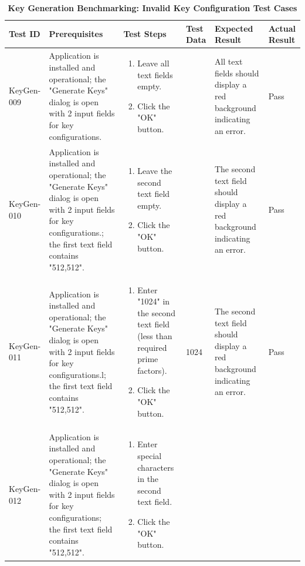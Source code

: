 \documentclass[]{final_report}
\theoremstyle{definition}
\begin{document}
\begin{longtable}{|p{1.5cm}|p{2.5cm}|p{3.5cm}|p{2.5cm}|p{3cm}|p{2cm}|}
  \caption{\textbf{Key Generation Benchmarking: Invalid Key Configuration Test Cases}} \\
  \hline
  \textbf{Test ID} & \textbf{Prerequisites} & \textbf{Test Steps} & \textbf{Test Data} & \textbf{Expected Result} & \textbf{Actual Result} \\
  \hline
  KeyGen-009 & Application is installed and operational; the "Generate Keys" dialog is open with 2 input fields for key configurations. & 
  \begin{enumerate}
  \item Leave all text fields empty.
  \item Click the "OK" button.
  \end{enumerate} & & All text fields should display a red background indicating an error. & Pass \\
  \hline
  KeyGen-010 & Application is installed and operational; the "Generate Keys" dialog is open with 2 input fields for key configurations.; the first text field contains "512,512". & 
  \begin{enumerate}
  \item Leave the second text field empty.
  \item Click the "OK" button.
  \end{enumerate} & & The second text field should display a red background indicating an error. & Pass \\
  \hline
  KeyGen-011 & Application is installed and operational; the "Generate Keys" dialog is open with 2 input fields for key configurations.l; the first text field contains "512,512". & 
  \begin{enumerate}
  \item Enter "1024" in the second text field (less than required prime factors).
  \item Click the "OK" button.
  \end{enumerate} & 1024 & The second text field should display a red background indicating an error. & Pass \\
  \hline
  KeyGen-012 & Application is installed and operational; the "Generate Keys" dialog is open with 2 input fields for key configurations; the first text field contains "512,512". & 
  \begin{enumerate}
  \item Enter special characters in the second text field.
  \item Click the "OK" button.

\end{enumerate}
\end{longtable}
\end{document}

